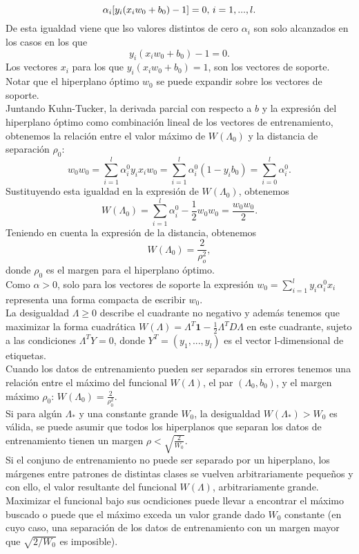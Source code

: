 \[ \alpha_i [y_i(x_iw_0+b_0)-1]=0 \textnormal{, } i=1,...,l. \]
De esta igualdad viene que lso valores distintos de cero $\alpha_i$ son solo alcanzados en los casos en los que
\[ y_i(x_iw_0+b_0)-1=0. \]
Los vectores $x_i$ para los que $y_i(x_iw_0+b_0)=1$, son los vectores de soporte. Notar que el hiperplano óptimo $w_0$ se puede expandir sobre los vectores de soporte.\\
Juntando Kuhn-Tucker, la derivada parcial con respecto a $b$ y la expresión del hiperplano óptimo como combinación lineal de los vectores de entrenamiento, obtenemos la relación entre el valor máximo de $W(\Lambda_0)$ y la distancia de separación $\rho_0$:
\[ w_0w_0=\sum_{i=1}^l \alpha_i^0 y_i x_i w_0=\sum_{i=1}^l \alpha_i^0 (1-y_ib_0)=\sum_{i=0}^l \alpha_i^0. \]
Sustituyendo esta igualdad en la expresión de $W(\Lambda_0)$, obtenemos
\[ W(\Lambda_0)= \sum_{i=1}^l \alpha_i^0 - \frac{1}{2} w_0 w_0 = \frac{w_0w_0}{2}. \]
Teniendo en cuenta la expresión de la distancia, obtenemos
\[ W(\Lambda_0)=\frac{2}{\rho_o^2}, \]
donde $\rho_0$ es el margen para el hiperplano óptimo.
\cite{cortes1995support}\\
Como $\alpha >0$, solo para los vectores de soporte la expresión $w_0= \sum_{i=1}^l y_i \alpha_i^0 x_i$ representa una forma compacta de escribir $w_0$.\\
La desigualdad $\Lambda \geq 0$ describe el cuadrante no negativo y además tenemos que maximizar la forma cuadrática $W(\Lambda)=\Lambda^T\textbf{1}-\frac{1}{2}\Lambda^TD\Lambda$ en este cuadrante, sujeto a las condiciones $\Lambda^TY=0$, donde $Y^T=(y_1,...,y_l)$ es el vector l-dimensional de etiquetas.\\
Cuando los datos de entrenamiento pueden ser separados sin errores tenemos una relación entre el máximo del funcional $W(\Lambda)$, el par $(\Lambda_0,b_0)$, y el margen máximo $\rho_0$: $W(\Lambda_0)=\frac{2}{\rho_0^2}$.\\
Si para algún $\Lambda_*$ y una constante grande $W_0$, la desigualdad $W(\Lambda_*) > W_0$ es válida, se puede asumir que todos los hiperplanos que separan los datos de entrenamiento tienen un margen $\rho < \sqrt{\frac{2}{W_0}}.$\cite{cortes1995support}\\
Si el conjuno de entrenamiento  no puede ser separado por un hiperplano, los márgenes entre patrones de distintas clases se vuelven arbitrariamente pequeños y con ello, el valor resultante del funcional $W(\Lambda)$, arbitrariamente grande. Maximizar el funcional bajo sus ocndiciones puede llevar a encontrar el máximo buscado o puede que el máximo exceda un valor grande dado $W_0$ constante (en cuyo caso, una separación de los datos de entrenamiento con un margen mayor que $\sqrt{2/W_0}$ es imposible).\\
